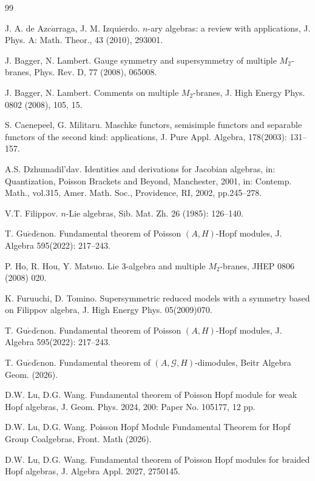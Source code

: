 \documentclass[11pt]{article}
\begin{document}

\begin{thebibliography}{99}

 J. A. de Azc$\acute{a}$rraga, J. M. Izquierdo. $n$-ary algebras: a review with applications, J. Phys. A: Math. Theor.,
43 (2010), 293001.

 J. Bagger, N. Lambert. Gauge symmetry and supersymmetry of multiple $M_2$-branes, Phys. Rev. D, 77 (2008), 065008.

 J. Bagger, N. Lambert. Comments on multiple $M_2$-branes, J. High Energy Phys. 0802 (2008), 105, 15.

 S. Caenepeel, G. Militaru. Maschke functors, semisimple functors and separable functors of the second kind: applications, J. Pure Appl. Algebra, 178(2003): 131--157.

 A.S. Dzhumadil'dav. Identities and derivations for Jacobian algebras, in: Quantization, Poisson Brackets and Beyond, Manchester, 2001, in: Contemp. Math., vol.315, Amer. Math. Soc., Providence, RI, 2002, pp.245--278.

 V.T. Filippov. $n$-Lie algebras, Sib. Mat. Zh. 26 (1985): 126--140.

 T. Gu$\acute{e}$d$\acute{e}$non. Fundamental theorem of Poisson $(A,H)$-Hopf modules, J. Algebra 595(2022): 217--243.

 P. Ho, R. Hou, Y. Matsuo. Lie 3-algebra and multiple $M_2$-branes, JHEP 0806 (2008) 020.

 K. Furuuchi, D. Tomino. Supersymmetric reduced models with a symmetry based on Filippov algebra, J. High Energy Phys. 05(2009)070.

 T. Gu$\acute{e}$d$\acute{e}$non. Fundamental theorem of Poisson $(A,H)$-Hopf modules, J. Algebra 595(2022): 217--243.

 T. Gu$\acute{e}$d$\acute{e}$non. Fundamental theorem of $(A,\mathcal{G},H)$-dimodules, Beitr Algebra Geom. (2026). 

 D.W. Lu, D.G. Wang. Fundamental theorem of Poisson Hopf module for weak Hopf algebras, J. Geom. Phys. 2024, 200: Paper No. 105177, 12 pp.
    
 D.W. Lu, D.G. Wang. Poisson Hopf Module Fundamental Theorem for Hopf Group Coalgebras, Front. Math (2026). 

 D.W. Lu, D.G. Wang. Fundamental theorem of Poisson Hopf modules for braided Hopf algebras, J. Algebra Appl. 2027, 2750145.


\end{thebibliography}
\end{document}
